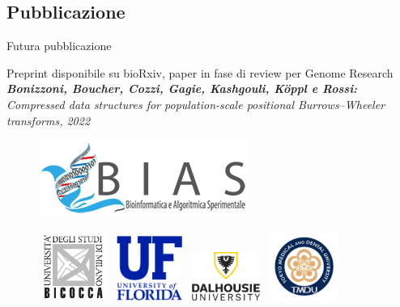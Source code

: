 \documentclass[]{beamer}
\begin{document}
\subsection{Pubblicazione}
\begin{frame}{Futura pubblicazione}
  \begin{block}{\small{Preprint disponibile su bioRxiv, paper in fase di
        review per Genome Research}}
    \footnotesize{\textit{\textbf{Bonizzoni, Boucher, Cozzi, Gagie, Kashgouli,
          K\"{o}ppl e Rossi:} \\Compressed data structures for population-scale
        positional Burrows--Wheeler transforms, 2022}}
  \end{block}
  \vspace{-0.2cm}
  \begin{figure}[H]
    \centering
    \includegraphics[scale = 0.6]{img/logo-bias-mini.png}
  \end{figure}
  \vspace{-0.3cm}
  \begin{figure}[H]
    \centering
    \includegraphics[width = 0.2\textwidth]{img/logo_unimib.pdf}~
    \includegraphics[width = 0.19\textwidth]{img/ufl.png}~
    \includegraphics[width = 0.2\textwidth]{img/dal.png}~
    \includegraphics[width = 0.2\textwidth]{img/tmdu.jpg}
  \end{figure}
\end{frame}
\end{document}
